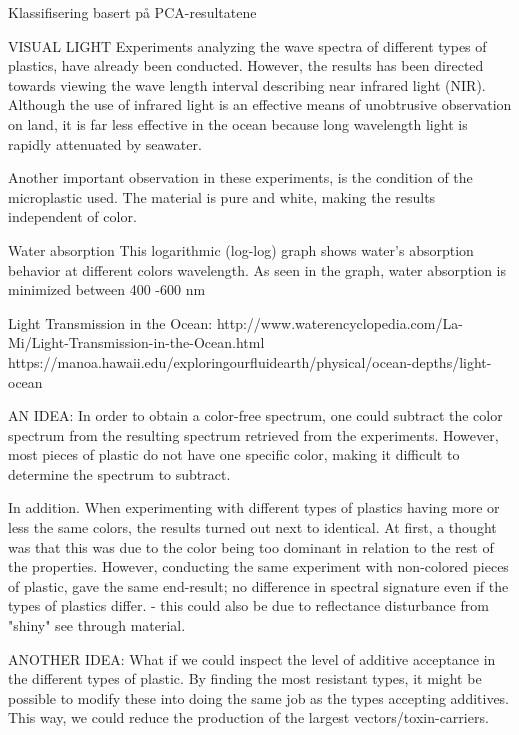 Klassifisering basert på PCA-resultatene





VISUAL LIGHT
Experiments analyzing the wave spectra of different types of plastics, have already been conducted. However, the results has been directed towards viewing the wave length interval describing near infrared light (NIR). Although the use of infrared light is an effective means of unobtrusive observation on land, it is far less effective in the ocean because long wavelength light is rapidly attenuated by seawater.

Another important observation in these experiments, is the condition of the microplastic used. The material is pure and white, making the results independent of color. 

Water absorption 
This logarithmic (log-log) graph shows water’s absorption behavior at different colors wavelength. As seen in the graph, water absorption is minimized between 400 -600 nm


Light Transmission in the Ocean: http://www.waterencyclopedia.com/La-Mi/Light-Transmission-in-the-Ocean.html
https://manoa.hawaii.edu/exploringourfluidearth/physical/ocean-depths/light-ocean


AN IDEA:
In order to obtain a color-free spectrum, one could subtract the color spectrum from the resulting spectrum retrieved from the experiments. However, most pieces of plastic do not have one specific color, making it difficult to determine the spectrum to subtract. 

In addition. When experimenting with different types of plastics having more or less the same colors, the results turned out next to identical. At first, a thought was that this was due to the color being too dominant in relation to the rest of the properties. However, conducting the same experiment with non-colored pieces of plastic, gave the same end-result; no difference in spectral signature even if the types of plastics differ. - this could also be due to reflectance disturbance from "shiny" see through material. 

ANOTHER IDEA: 
What if we could inspect the level of additive acceptance in the different types of plastic. By finding the most resistant types, it might be possible to modify these into doing the same job as the types accepting additives. This way, we could reduce the production of the largest vectors/toxin-carriers. 